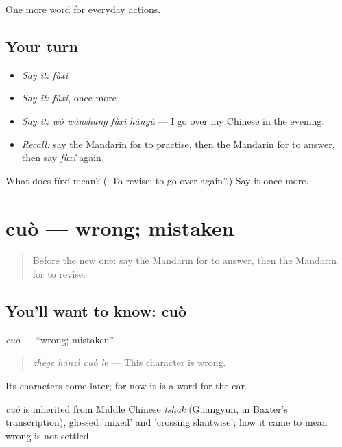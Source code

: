 \begin{grammarlens}[title={What you've built}]
One more word for everyday actions.
\end{grammarlens}

\subsection*{Your turn}
\begin{itemize}
\raggedright
  \item \emph{Say it:} \emph{fùxí}
  \item \emph{Say it:} \emph{fùxí}, once more
  \item \emph{Say it:} \emph{wǒ wǎnshang fùxí hànyǔ} — I go over my Chinese in the evening.
  \item \emph{Recall:} say the Mandarin for to practise, then the Mandarin for to answer, then say \emph{fùxí} again
\end{itemize}

\begin{tcolorbox}[breakable,colback=teal!4,colframe=teal!35!black,title={Before you move on}]
What does fùxí mean? (\textquotedblleft{}To revise; to go over again\textquotedblright{}.) Say it once more.
\end{tcolorbox}
\section[cuò]{cuò — wrong; mistaken}

\label{lesson:ZH-C121-cuo}



\begin{quote}
Before the new one: say the Mandarin for to answer, then the Mandarin for to revise.
\end{quote}

\subsection*{You'll want to know: cuò}
\emph{cuò} — \textquotedblleft{}wrong; mistaken\textquotedblright{}.

\begin{quote}
\emph{zhège hànzì cuò le} — This character is wrong.
\end{quote}

Its characters come later; for now it is a word for the ear.

\begin{cousinweb}
\emph{cuò} is inherited from Middle Chinese \emph{tshak} (Guangyun, in Baxter's transcription), glossed 'mixed' and 'crossing slantwise'; how it came to mean wrong is not settled.
\end{cousinweb}

